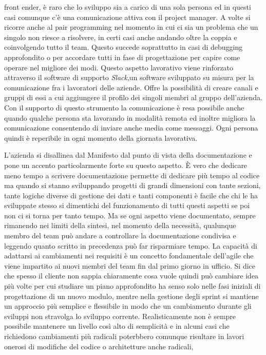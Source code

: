 \documentclass[target=bach,aauheader=,style=]{thud}
\begin{document}
front ender, è raro che lo sviluppo sia a carico di una sola persona ed in questi casi comunque c'è una comunicazione attiva con il project manager.
A volte si ricorre anche al pair programming nel momento in cui ci sia un problema che un singolo non riesce a risolvere, in certi casi anche andando oltre la
coppia e coinvolgendo tutto il team. Questo succede soprattutto in casi di debugging approfondito o per accordare tutti in fase di progettazione per capire
come operare nel migliore dei modi.
Questo aspetto lavorativo viene rinforzato attraverso il software di supporto \textit{Slack}\cite{slack},un software sviluppato su misura per la comunicazione fra
i lavoratori delle aziende. Offre la possibilità di creare canali e gruppi di essi a cui aggiungere il profilo dei singoli membri al gruppo dell'azienda.
Con il supporto di questo strumento la comunicazione è resa possibile anche quando qualche persona sta lavorando in modalità remota ed inoltre migliora la
comunicazione consentendo di inviare anche media come messaggi. Ogni persona quindi è reperibile in ogni momento della giornata lavorativa.
\par L'azienda si disallinea dal Manifesto dal punto di vista della documentazione e pone un accento particolarmente forte su questo aspetto.
È vero che dedicare meno tempo a scrivere documentazione permette di dedicare più tempo al codice ma quando si stanno sviluppando progetti di grandi dimensioni
con tante sezioni, tante logiche diverse di gestione dei dati e tanti componenti è facile che chi le ha sviluppate stesso si dimentichi del funzionamento di
tutti questi aspetti se poi non ci si torna per tanto tempo. Ma se ogni aspetto viene documentato, sempre rimanendo nei limiti della sintesi, nel momento della
necessità, qualunque membro del team può andare a controllare la documentazione condivisa e leggendo quanto scritto in precedenza può far risparmiare tempo.
La capacità di adattarsi ai cambiamenti nei requisiti è un concetto fondamentale dell'agile che viene impartito ai nuovi membri del team fin dal primo giorno
in ufficio. Si dice che spesso il cliente non sappia chiaramente cosa vuole quindi può cambiare idea più volte per cui studiare un piano approfondito ha
senso solo nelle fasi iniziali di progettazione di un nuovo modulo, mentre nella gestione degli sprint si mantiene un approccio più semplice e flessibile in modo
che un cambiamento durante gli sviluppi non stravolga lo sviluppo corrente. Realisticamente non è sempre possibile mantenere un livello così alto di semplicità
e in alcuni casi che richiedono cambiamenti più radicali poterbbero comunque risultare in lavori onerosi di modifiche del codice o architetture anche radicali,
\end{document}
